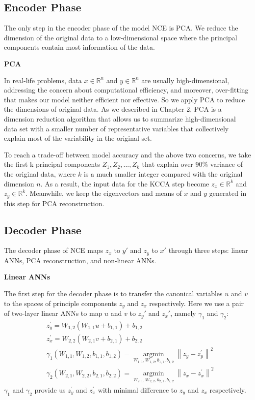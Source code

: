 \documentclass[12pt]{report} %
\newcommand{\norm}[1]{\left\lVert #1 \right\rVert}
\begin{document}
\subsection{Encoder Phase}
The only step in the encoder phase of the model NCE is PCA. We reduce the dimension of the original data to a low-dimensional space where the principal components contain most information of the data. 

\textbf{PCA}

In real-life problems, data $x\in \mathbb{R}^{n}$ and $y\in \mathbb{R}^{n}$ are usually high-dimensional, addressing the concern about computational efficiency, and moreover, over-fitting\cite{STAT} that makes our model neither efficient nor effective. So we apply PCA to reduce the dimensions of original data. As we described in Chapter 2, PCA is a dimension reduction algorithm that allows us to summarize high-dimensional data set with a smaller number of representative variables that collectively explain most of the variability in the original set.

To reach a trade-off between model accuracy and the above two concerns, we take the first k principal components \(Z_{1}, Z_{2},..., Z_{k}\) that explain over 90\% variance of the original data, where $k$ is a much smaller integer compared with the original dimension $n$. As a result, the input data for the KCCA step become $z_x\in \mathbb{R}^{k}$ and $z_y\in \mathbb{R}^{k}$. Meanwhile, we keep the eigenvectors and means of $x$ and $y$ generated in this step for PCA reconstruction.

\subsection{Decoder Phase}
The decoder phase of NCE maps $z_x$ to $y'$ and $z_y$ to $x'$ through three steps: linear ANNs, PCA reconstruction, and non-linear ANNs.

\textbf{Linear ANNs}

The first step for the decoder phase is to transfer the canonical variables $u$ and $v$ to the spaces of principle components $z_y$ and $z_x$ respectively. Here we use a pair of two-layer linear ANNs to map $u$ and $v$ to $z_y{'}$ and $z_x{'}$, namely $\gamma_1$ and $\gamma_2$:
\begin{equation}
\begin{split}
&z_y^{'}=W_{1,2}(W_{1,1}u+b_{1,1})+b_{1,2} \\
&z_x^{'}=W_{2,2}(W_{2,1}v+b_{2,1})+b_{2,2} \\
&\gamma_1(W_{1,1},W_{1,2},b_{1,1},b_{1,2})=\operatorname*{argmin}_{W_{1,1},W_{1,2},b_{1,1},b_{1,2}}\norm{z_y-z_y^{'}}^2 \\
&\gamma_2(W_{2,1},W_{2,2},b_{2,1},b_{2,2})=\operatorname*{argmin}_{W_{2,1},W_{2,2},b_{2,1},b_{2,2}}\norm{z_x-z_x^{'}}^2
\end{split}
\end{equation}
$\gamma_1$ and $\gamma_2$ provide us $z_y^{'}$ and $z_x^{'}$ with minimal difference to $z_y$ and $z_x$ respectively.
\end{document}
